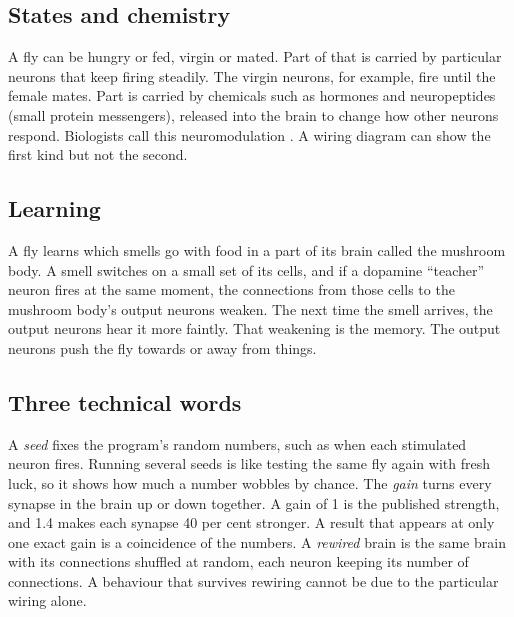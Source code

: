\documentclass[11pt,a4paper]{article}
\begin{document}
\subsection*{States and chemistry}

A fly can be hungry or fed, virgin or mated. Part of that is carried by particular neurons that keep firing steadily. The virgin neurons, for example, fire until the female mates. Part is carried by chemicals such as hormones and neuropeptides (small protein messengers), released into the brain to change how other neurons respond. Biologists call this neuromodulation \citep{marder2012neuromodulation}. A wiring diagram can show the first kind but not the second.

\subsection*{Learning}

A fly learns which smells go with food in a part of its brain called the mushroom body. A smell switches on a small set of its cells, and if a dopamine ``teacher'' neuron fires at the same moment, the connections from those cells to the mushroom body's output neurons weaken. The next time the smell arrives, the output neurons hear it more faintly. That weakening is the memory. The output neurons push the fly towards or away from things.

\subsection*{Three technical words}

A \emph{seed} fixes the program's random numbers, such as when each stimulated neuron fires. Running several seeds is like testing the same fly again with fresh luck, so it shows how much a number wobbles by chance. The \emph{gain} turns every synapse in the brain up or down together. A gain of 1 is the published strength, and 1.4 makes each synapse 40 per cent stronger. A result that appears at only one exact gain is a coincidence of the numbers. A \emph{rewired} brain is the same brain with its connections shuffled at random, each neuron keeping its number of connections. A behaviour that survives rewiring cannot be due to the particular wiring alone.
\end{document}
